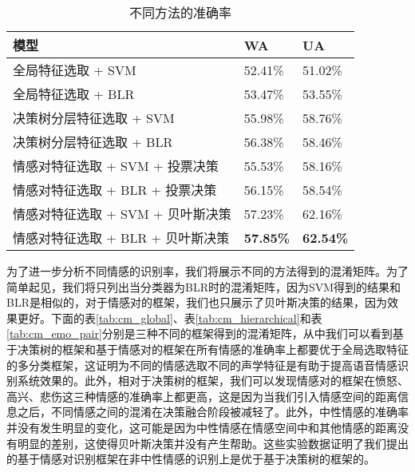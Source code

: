 \begin{table}[htb]
\centering
\begin{minipage}[htb]{1.0\linewidth} %
\caption{不同方法的准确率}
\label{tab:acc_emo_pair}
    \begin{tabularx}{\linewidth}{X<{\centering} X<{\centering} X<{\centering}}
        \toprule[1.5pt]
        模型 & WA & UA \\
        \midrule[1pt]
        全局特征选取 + SVM & 52.41\% & 51.02\% \\
        全局特征选取 + BLR & 53.47\% & 53.55\% \\
        决策树分层特征选取 + SVM & 55.98\% & 58.76\% \\
        决策树分层特征选取 + BLR & 56.38\% & 58.46\% \\
        情感对特征选取 + SVM + 投票决策 & 55.53\% & 58.16\% \\
        情感对特征选取 + BLR + 投票决策 & 56.15\% & 58.54\% \\
        情感对特征选取 + SVM + 贝叶斯决策 & 57.23\% & 62.16\% \\
        情感对特征选取 + BLR + 贝叶斯决策 & \textbf{57.85\%} & \textbf{62.54\%} \\
        \bottomrule[1.5pt]
    \end{tabularx}
\end{minipage}
\end{table}

为了进一步分析不同情感的识别率，我们将展示不同的方法得到的混淆矩阵。为了简单起见，我们将只列出当分类器为BLR时的混淆矩阵，因为SVM得到的结果和BLR是相似的，对于情感对的框架，我们也只展示了贝叶斯决策的结果，因为效果更好。下面的表\ref{tab:cm_global}、表\ref{tab:cm_hierarchical}和表\ref{tab:cm_emo_pair}分别是三种不同的框架得到的混淆矩阵，从中我们可以看到基于决策树的框架和基于情感对的框架在所有情感的准确率上都要优于全局选取特征的多分类框架，这证明为不同的情感选取不同的声学特征是有助于提高语音情感识别系统效果的。此外，相对于决策树的框架，我们可以发现情感对的框架在愤怒、高兴、悲伤这三种情感的准确率上都更高，这是因为当我们引入情感空间的距离信息之后，不同情感之间的混淆在决策融合阶段被减轻了。此外，中性情感的准确率并没有发生明显的变化，这可能是因为中性情感在情感空间中和其他情感的距离没有明显的差别，这使得贝叶斯决策并没有产生帮助。这些实验数据证明了我们提出的基于情感对识别框架在非中性情感的识别上是优于基于决策树的框架的。

